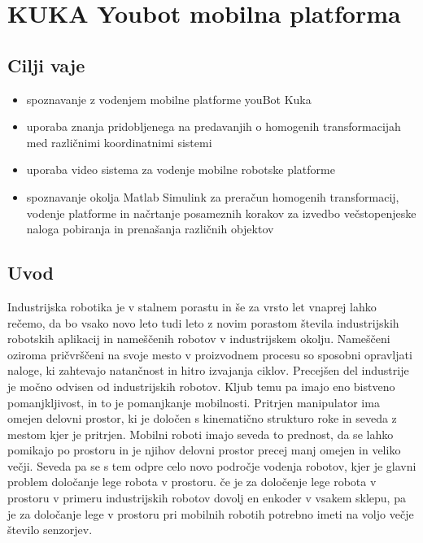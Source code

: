 
\chapter{{KUKA Youbot mobilna platforma}}

\vspace{-1.5cm}

\begin{mdframed}[backgroundcolor=green!20, shadow=true,roundcorner=8pt]
\vspace{-0.35cm}
\section{Cilji vaje}
\begin{itemize}
\item spoznavanje z vodenjem mobilne platforme youBot Kuka
\item uporaba znanja pridobljenega na predavanjih o homogenih transformacijah med različnimi koordinatnimi sistemi
\item uporaba video sistema za vodenje mobilne robotske platforme
\item spoznavanje okolja Matlab Simulink za preračun homogenih transformacij, vodenje platforme in načrtanje posameznih korakov za izvedbo večstopenjeske naloga pobiranja in prenašanja različnih objektov


\end{itemize}
\end{mdframed}



\section{Uvod}
 Industrijska robotika je v stalnem porastu in še za vrsto let vnaprej lahko rečemo, da bo vsako novo leto tudi leto z novim porastom števila industrijskih robotskih aplikacij in nameščenih robotov v industrijskem okolju. Nameščeni oziroma pričvrščeni na svoje mesto v proizvodnem procesu so sposobni opravljati naloge, ki zahtevajo natančnost in hitro izvajanja ciklov. Precejšen del industrije je močno odvisen od industrijskih robotov. Kljub temu pa imajo eno bistveno pomanjkljivost, in to je pomanjkanje mobilnosti. Pritrjen manipulator ima omejen delovni prostor, ki je določen s kinematično strukturo roke in seveda z mestom kjer je pritrjen. Mobilni roboti imajo seveda to prednost, da se lahko pomikajo po prostoru in je njihov delovni prostor precej manj omejen in veliko večji. Seveda pa se s tem odpre celo novo področje vodenja robotov, kjer je glavni problem določanje lege robota v prostoru. če je za določenje lege robota v prostoru v primeru industrijskih robotov dovolj en enkoder v vsakem sklepu, pa je za določanje lege v prostoru pri mobilnih robotih potrebno imeti na voljo večje število senzorjev.

